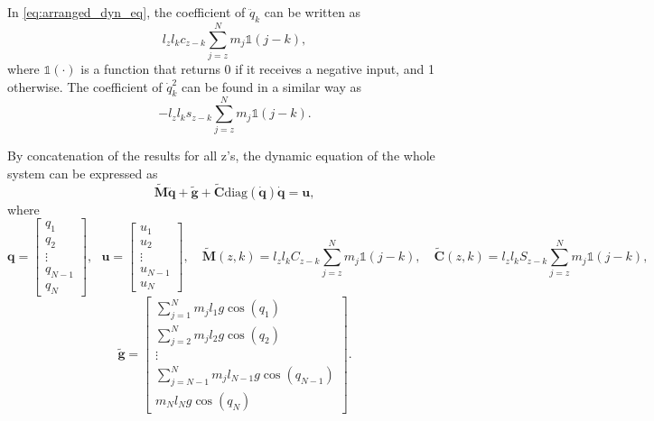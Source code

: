 \documentclass[10pt,a4paper]{article} %
\begin{document}
In \eqref{eq:arranged_dyn_eq}, the coefficient of $\ddot{q}_k$ can be written as 
\begin{equation*}
	l_z l_k c_{z-k} \sum_{j=z}^N m_j \mathds{1}(j-k),
\end{equation*}
where $\mathds{1}(\cdot)$ is a function that returns 0 if it receives a negative input, and 1 otherwise. The coefficient of $\dot{q}_k^2$ can be found in a similar way as 
\begin{equation*}
	-l_z l_k s_{z-k} \sum_{j=z}^N m_j \mathds{1}(j-k).
\end{equation*}

By concatenation of the results for all z's, the dynamic equation of the whole system can be expressed as
\begin{equation}
	\tilde{\bm{M}} \ddot{\bm{q}} + \tilde{\bm{g}} + \tilde{\bm{C}}\text{diag}(\bm{\dot{q}})\bm{\dot{q}}= \bm{u},
	\label{eq:matix_form_dynamic_abs_angle_net_forces}
\end{equation}
where
\begin{equation*}
	\bm{q}= \begin{bmatrix}
	q_1 \\ q_2 \\ \vdots \\ q_{N-1} \\ q_N 
	\end{bmatrix}, \ \ \ \bm{u}= \begin{bmatrix}
	u_1 \\ u_2 \\ \vdots \\ u_{N-1} \\ u_N 
	\end{bmatrix},\quad
	\tilde{\bm{M}}(z,k)= l_z l_k C_{z-k} \sum_{j=z}^N m_j \mathds{1}(j-k),\quad
	\tilde{\bm{C}}(z,k)= l_zl_k S_{z-k} \sum_{j=z}^N m_j \mathds{1}(j-k),
\end{equation*}
\begin{equation*}
\tilde{\bm{g}}= \begin{bmatrix}
	\sum_{j=1}^N m_j l_1 g \cos(q_1) \\ \sum_{j=2}^N m_j l_2 g \cos(q_2) \\ \vdots \\ \sum_{j={N-1}}^N m_jl_{N-1} g \cos(q_{N-1}) \\ m_Nl_N g \cos(q_N)
\end{bmatrix}.
\end{equation*}
\end{document}
